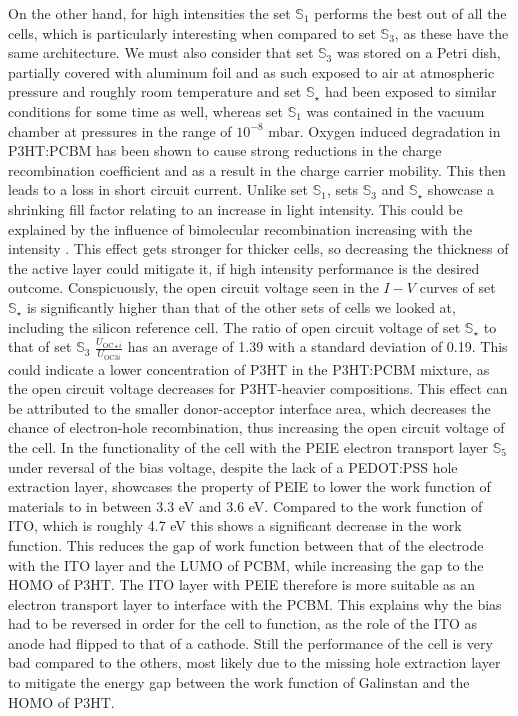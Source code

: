 \documentclass[a4paper,10pt,twocolumn]{article}
\begin{document}
\begin{extract*}
On the other hand, for high intensities the set $\mathbb{S}_1$ performs the best out of all the cells, which is particularly interesting when compared to set $\mathbb{S}_3$, as these have the same architecture. We must also consider that set $\mathbb{S}_3$ was stored on a Petri dish, partially covered with aluminum foil and as such exposed to air at atmospheric pressure and roughly room temperature and set $\mathbb{S}_\star$ had been exposed to similar conditions for some time as well, whereas set $\mathbb{S}_1$ was contained in the vacuum chamber at pressures in the range of $10^{-8}$ mbar. Oxygen induced degradation in P3HT:PCBM has been shown\cite{source14} to cause strong reductions in the charge recombination coefficient and as a result in the charge carrier mobility. This then leads to a loss in short circuit current.\mypar
Unlike set $\mathbb{S}_1$, sets $\mathbb{S}_3$ and $\mathbb{S}_\star$ showcase a shrinking fill factor relating to an increase in light intensity. This could be explained by the influence of bimolecular recombination increasing with the intensity \cite{source15}. This effect gets stronger for thicker cells, so decreasing the thickness of the active layer could mitigate it, if high intensity performance is the desired outcome.\mypar
Conspicuously, the open circuit voltage seen in the $I-V$ curves of set $\mathbb{S}_\star$ is significantly higher than that of the other sets of cells we looked at, including the silicon reference cell. The ratio of open circuit voltage of set $\mathbb{S}_\star$ to that of set $\mathbb{S}_3$ $\frac{U_{\mathrm{OC}\star i}}{U_{\mathrm{OC}3i}}$ has an average of 1.39 with a standard deviation of 0.19. This could indicate a lower concentration of P3HT in the P3HT:PCBM mixture, as the open circuit voltage decreases for P3HT-heavier compositions\cite{source8}. This effect can be attributed to the smaller donor-acceptor interface area, which decreases the chance of electron-hole recombination, thus increasing the open circuit voltage of the cell.\cite{source8}\mypar
In the functionality of the cell with the PEIE electron transport layer $\mathbb{S}_5$ under reversal of the bias voltage, despite the lack of a PEDOT:PSS hole extraction layer, showcases the property of PEIE to lower the work function of materials to in between 3.3 eV and 3.6 eV. Compared to the work function of ITO, which is roughly 4.7 eV\cite{source5} this shows a significant decrease in the work function. This reduces the gap of work function between that of the electrode with the ITO layer and the LUMO of PCBM, while increasing the gap to the HOMO of P3HT. The ITO layer with PEIE therefore is more suitable as an electron transport layer to interface with the PCBM. This explains why the bias had to be reversed in order for the cell to function, as the role of the ITO as anode had flipped to that of a cathode. Still the performance of the cell is very bad compared to the others, most likely due to the missing hole extraction layer to mitigate the energy gap between the work function of Galinstan and the HOMO of P3HT.
\end{extract*}
\end{document}
